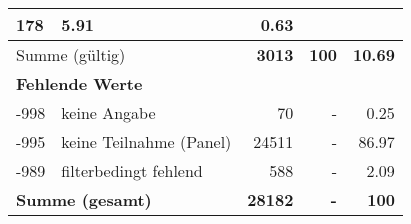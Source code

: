 \begin{longtable}{lXrrr}
       \num{178} &
       \num[round-mode=places,round-precision=2]{5.91} &
         \num[round-mode=places,round-precision=2]{0.63} \\
     \midrule
     \multicolumn{2}{l}{Summe (gültig)} &
       \textbf{\num{3013}} &
     \textbf{\num{100}} &
       \textbf{\num[round-mode=places,round-precision=2]{10.69}} \\
     \multicolumn{5}{l}{\textbf{Fehlende Werte}}\\
       -998 &
       keine Angabe &
         \num{70} &
        - &
         \num[round-mode=places,round-precision=2]{0.25} \\
       -995 &
       keine Teilnahme (Panel) &
         \num{24511} &
        - &
         \num[round-mode=places,round-precision=2]{86.97} \\
       -989 &
       filterbedingt fehlend &
         \num{588} &
        - &
         \num[round-mode=places,round-precision=2]{2.09} \\
     \midrule
     \multicolumn{2}{l}{\textbf{Summe (gesamt)}} &
          \textbf{\num{28182}} &
        \textbf{-} &
        \textbf{\num{100}} \\
     \bottomrule
     \end{longtable}
     

